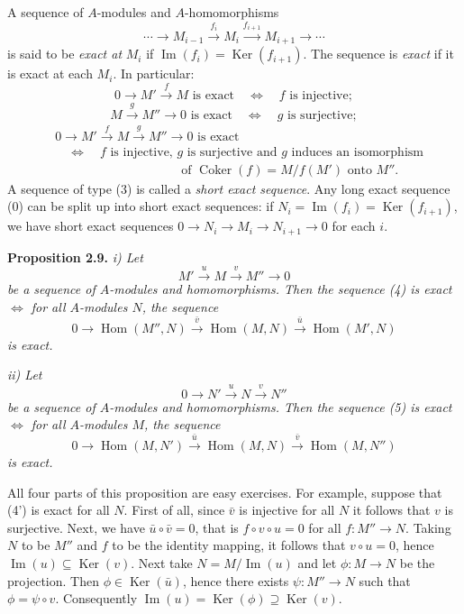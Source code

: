 A sequence of \(A\)-modules and \(A\)-homomorphisms
\[
\cdots\longrightarrow M_{i-1}\xrightarrow{f_i}M_i\xrightarrow{f_{i+1}}M_{i+1}\longrightarrow\cdots \tag{0}
\]
is said to be \emph{exact at} \(M_i\) if \(\operatorname{Im}(f_i)=\operatorname{Ker}(f_{i+1})\). The sequence is \emph{exact} if it is exact at each \(M_i\). In particular:
\[
0\longrightarrow M'\xrightarrow{f}M\text{ is exact}\quad\Longleftrightarrow\quad f\text{ is injective}; \tag{1}
\]
\[
M\xrightarrow{g}M''\longrightarrow0\text{ is exact}\quad\Longleftrightarrow\quad g\text{ is surjective}; \tag{2}
\]
\[
\begin{aligned}
&0\longrightarrow M'\xrightarrow{f}M\xrightarrow{g}M''\longrightarrow0\text{ is exact}\\
&\quad\Longleftrightarrow\quad f\text{ is injective, }g\text{ is surjective and }g\text{ induces an isomorphism}\\
&\hspace{10em}\text{of }\operatorname{Coker}(f)=M/f(M')\text{ onto }M''.
\end{aligned}\tag{3}
\]
A sequence of type (3) is called a \emph{short exact sequence}. Any long exact sequence (0) can be split up into short exact sequences: if \(N_i=\operatorname{Im}(f_i)=\operatorname{Ker}(f_{i+1})\), we have short exact sequences \(0\to N_i\to M_i\to N_{i+1}\to0\) for each \(i\).

\noindent\textbf{Proposition 2.9.} \emph{i) Let}
\[
M'\xrightarrow{u}M\xrightarrow{v}M''\longrightarrow0 \tag{4}
\]
\emph{be a sequence of \(A\)-modules and homomorphisms. Then the sequence (4) is exact \(\Longleftrightarrow\) for all \(A\)-modules \(N\), the sequence}
\[
0\longrightarrow\operatorname{Hom}(M'',N)\xrightarrow{\bar v}\operatorname{Hom}(M,N)\xrightarrow{\bar u}\operatorname{Hom}(M',N) \tag{4'}
\]
\emph{is exact.}

\emph{ii) Let}
\[
0\longrightarrow N'\xrightarrow{u}N\xrightarrow{v}N'' \tag{5}
\]
\emph{be a sequence of \(A\)-modules and homomorphisms. Then the sequence (5) is exact \(\Longleftrightarrow\) for all \(A\)-modules \(M\), the sequence}
\[
0\longrightarrow\operatorname{Hom}(M,N')\xrightarrow{\bar u}\operatorname{Hom}(M,N)\xrightarrow{\bar v}\operatorname{Hom}(M,N'') \tag{5'}
\]
\emph{is exact.}

All four parts of this proposition are easy exercises. For example, suppose that (4') is exact for all \(N\). First of all, since \(\bar v\) is injective for all \(N\) it follows that \(v\) is surjective. Next, we have \(\bar u\circ\bar v=0\), that is \(f\circ v\circ u=0\) for all \(f:M''\to N\). Taking \(N\) to be \(M''\) and \(f\) to be the identity mapping, it follows that \(v\circ u=0\), hence \(\operatorname{Im}(u)\subseteq\operatorname{Ker}(v)\). Next take \(N=M/\operatorname{Im}(u)\) and let \(\phi:M\to N\) be the projection. Then \(\phi\in\operatorname{Ker}(\bar u)\), hence there exists \(\psi:M''\to N\) such that \(\phi=\psi\circ v\). Consequently \(\operatorname{Im}(u)=\operatorname{Ker}(\phi)\supseteq\operatorname{Ker}(v)\). \proofbox

